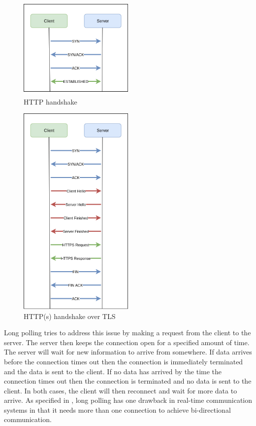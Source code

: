 \begin{figure}[ht]
  \centering
    \includegraphics[width=0.5\textwidth]{figures/http-handshake.png}
    \caption{HTTP handshake}
    \label{fig:http-handshake}
\end{figure}

\begin{figure}[ht]
  \centering
    \includegraphics[width=0.5\textwidth]{figures/https-handshake.png}
    \caption{HTTP(s) handshake over TLS}
    \label{fig:https-handshake}
\end{figure}

Long polling tries to address this issue by making a request from the client to the server. The server then keeps the connection open for a specified amount of time. The server will wait for new information to arrive from somewhere. If data arrives before the connection times out then the connection is immediately terminated and the data is sent to the client. If no data has arrived by the time the connection times out then the connection is terminated and no data is sent to the client. In both cases, the client will then reconnect and wait for more data to arrive. As specified in \cite{6364271}, long polling has one drawback in real-time communication systems in that it needs more than one connection to achieve bi-directional communication.


